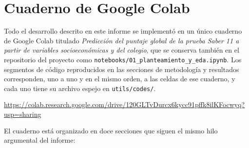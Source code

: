 \section{Cuaderno de Google Colab}
    Todo el desarrollo descrito en este informe se implementó en un único
    cuaderno de Google Colab titulado \textit{Predicción del puntaje global de la
    prueba Saber 11 a partir de variables socioeconómicas y del colegio}, que se
    conserva también en el repositorio del proyecto como
    \texttt{notebooks/01\_planteamiento\_y\_eda.ipynb}. Los segmentos de código
    reproducidos en las secciones de metodología y resultados corresponden, uno a
    uno y en el mismo orden, a las celdas de ese cuaderno, y cada uno tiene su
    archivo espejo en \texttt{utils/codes/}.

    \vspace{10pt}

    \begin{tcolorbox}[
        sharp corners,
        colback=green!7!white,
        colframe=green!55!black,
        boxrule=1.2pt,
        fonttitle=\bfseries,
        title=Cuaderno interactivo disponible en Google Colab
    ]
        \centering


        {\color{green!40!black}%
        \url{https://colab.research.google.com/drive/120GLTvDurcx6kycc91pffk8ilKFocwyq?usp=sharing}}

    \end{tcolorbox}

    \vspace{10pt}

    El cuaderno está organizado en doce secciones que siguen el mismo hilo
    argumental del informe:

    \vspace{10pt}

